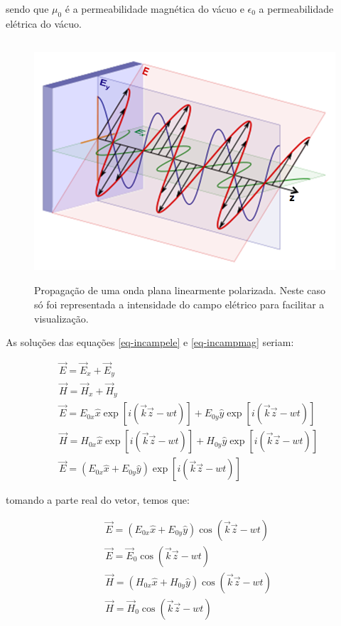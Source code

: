 sendo que $\mu_{0}$ é a permeabilidade magnética do vácuo e
$\epsilon_{0}$ a permeabilidade elétrica do vácuo.

\begin{figure} [h]
  \begin{center}
    \includegraphics[height=253pt,width=350pt]{images/fig_luz-lpol}
    \caption{Propagação de uma onda plana linearmente
      polarizada. Neste caso só foi representada a intensidade do
      campo elétrico para facilitar a
      visualização.\cite{68}}\label{fig:luz-lpol}
  \end{center}
\end{figure}

As soluções das equações \eqref{eq-incampele} e \eqref{eq-incampmag}
seriam:

\begin{align}
 &\vec{E}  = \vec{E}_{x} + \vec{E}_{y} \\
 &\vec{H}  = \vec{H}_{x} + \vec{H}_{y} \\
 &\vec{E}  = E_{0x}\hat{x}\exp[i(\vec{k}\vec{z}-wt)] + E_{0y}\hat{y}\exp[i(\vec{k}\vec{z}-wt)]\\
 &\vec{H}  = H_{0x}\hat{x}\exp[i(\vec{k}\vec{z}-wt)] + H_{0y}\hat{y}\exp[i(\vec{k}\vec{z}-wt)]\\
 &\vec{E}  = (E_{0x}\hat{x} + E_{0y}\hat{y})\exp[i(\vec{k}\vec{z}-wt)]
\end{align}

tomando a parte real do vetor, temos que:

\begin{align}
 &\vec{E}  = (E_{0x}\hat{x} + E_{0y}\hat{y})\cos(\vec{k}\vec{z}-wt)\label{eq-ellpol}\\
 &\vec{E}  = \vec{E}_{0}\cos(\vec{k}\vec{z}-wt)\label{eq-ellpol}\\
 &\vec{H}  = (H_{0x}\hat{x} + H_{0y}\hat{y})\cos(\vec{k}\vec{z}-wt)\label{eq-hllpol}\\
 &\vec{H}  = \vec{H}_{0}\cos(\vec{k}\vec{z}-wt)\label{eq-ellpol}
\end{align}


